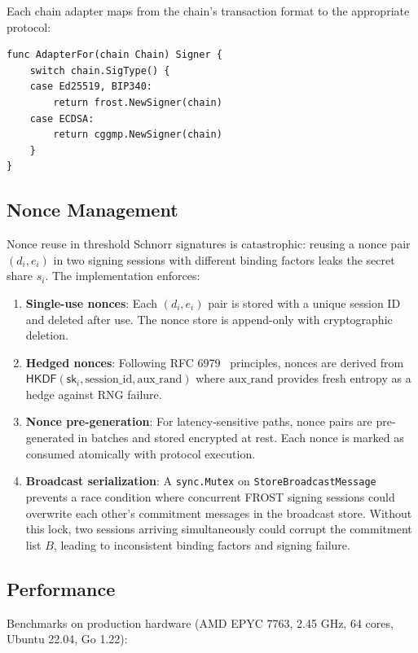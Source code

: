 Each chain adapter maps from the chain's transaction format to the appropriate
protocol:

\begin{verbatim}
func AdapterFor(chain Chain) Signer {
    switch chain.SigType() {
    case Ed25519, BIP340:
        return frost.NewSigner(chain)
    case ECDSA:
        return cggmp.NewSigner(chain)
    }
}
\end{verbatim}

\subsection{Nonce Management}

Nonce reuse in threshold Schnorr signatures is catastrophic: reusing a nonce pair
$(d_i, e_i)$ in two signing sessions with different binding factors leaks the
secret share $s_i$. The implementation enforces:

\begin{enumerate}[nosep]
  \item \textbf{Single-use nonces}: Each $(d_i, e_i)$ pair is stored with a unique
    session ID and deleted after use. The nonce store is append-only with
    cryptographic deletion.
  \item \textbf{Hedged nonces}: Following RFC 6979~\cite{rfc6979} principles, nonces
    are derived from $\mathsf{HKDF}(\mathsf{sk}_i, \text{session\_id}, \text{aux\_rand})$
    where $\text{aux\_rand}$ provides fresh entropy as a hedge against
    RNG failure.
  \item \textbf{Nonce pre-generation}: For latency-sensitive paths, nonce pairs are
    pre-generated in batches and stored encrypted at rest. Each nonce is marked as
    consumed atomically with protocol execution.
  \item \textbf{Broadcast serialization}: A \texttt{sync.Mutex} on
    \texttt{StoreBroadcastMessage} prevents a race condition where concurrent FROST
    signing sessions could overwrite each other's commitment messages in the broadcast
    store. Without this lock, two sessions arriving simultaneously could corrupt the
    commitment list $B$, leading to inconsistent binding factors and signing failure.
\end{enumerate}

\subsection{Performance}

Benchmarks on production hardware (AMD EPYC 7763, 2.45 GHz, 64 cores, Ubuntu 22.04,
Go 1.22):


